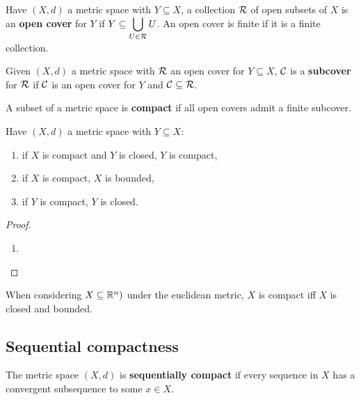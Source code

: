 \documentclass[../Year2.tex]{subfiles}
\begin{document}
\begin{definition}[Cover]
    Have $(X,d)$ a metric space with $Y\subseteq X$, a collection $\mathcal{R}$ of open subsets of $X$ is an \textbf{open cover} for $Y$ if $Y\displaystyle\subseteq \bigcup_{U\in\mathcal{R}}U$. An open cover is finite if it is a finite collection.
\end{definition}

\begin{definition}[Subcover]
    Given $(X,d)$ a metric space with $\mathcal{R}$ an open cover for $Y\subseteq X$, $\mathcal{C}$ is a \textbf{subcover} for $\mathcal{R}$ if $\mathcal{C}$ is an open cover for $Y$ and $\mathcal{C}\subseteq\mathcal{R}$.
\end{definition}

\begin{definition}[Compact]
    A subset of a metric space is \textbf{compact} if all open covers admit a finite subcover.
\end{definition}

\begin{proposition}
    Have $(X,d)$ a metric space with $Y\subseteq X$: \begin{enumerate}
        \item if $X$ is compact and $Y$ is closed, $Y$ is compact,
        \item if $X$ is compact, $X$ is bounded,
        \item if $Y$ is compact, $Y$ is closed.
    \end{enumerate}
    \begin{proof}
        \begin{enumerate}
            \item 
        \end{enumerate}
    \end{proof}
\end{proposition}

\begin{theorem}
    When considering $X\subseteq \mathbb{R}^n)$ under the euclidean metric, $X$ is compact iff $X$ is closed and bounded.
\end{theorem}

\subsection{Sequential compactness}

\begin{definition}
    The metric space $(X,d)$ is \textbf{sequentially compact} if every sequence in $X$ has a convergent subsequence to some $x\in X$.
\end{definition}
\end{document}
